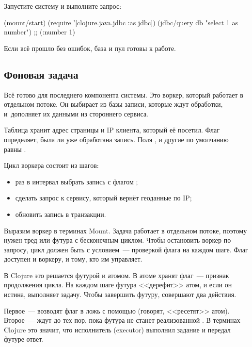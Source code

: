 Запустите систему и выполните запрос:

\begin{clojure}
(mount/start)
(require '[clojure.java.jdbc :as jdbc])
(jdbc/query db "select 1 as number")
;; ({:number 1})
\end{clojure}

Если всё прошло без ошибок, база и пул готовы к работе.

\subsection{Фоновая задача}

\label{worker}

Всё готово для последнего компонента системы. Это воркер, который работает в
отдельном потоке. Он выбирает из базы записи, которые ждут обработки,
и~дополняет их данными из стороннего сервиса.

Таблица  хранит адрес страницы и IP клиента, который её
посетил. Флаг  определяет, была ли уже обработана
запись. Поля ,  и другие по умолчанию равны
.


Цикл воркера состоит из шагов:

\begin{itemize}

\item
  раз в интервал выбрать запись с флагом ;

\item
  сделать запрос к сервису, который вернёт геоданные по IP;

\item
  обновить запись в транзакции.

\end{itemize}

Выразим воркер в терминах Mount. Задача работает в отдельном потоке, поэтому
нужен тред или футура с бесконечным циклом. Чтобы остановить воркер по запросу,
цикл должен быть с условием~--- проверкой флага на каждом шаге. Флаг доступен и
воркеру, и тому, кто им управляет.


В Clojure это решается футурой и атомом. В атоме хранят флаг~--- признак
продолжения цикла. На каждом шаге футура <<дерефит>> атом, и если он истина,
выполняет задачу. Чтобы завершить футуру, совершают два действия.

Первое~--- возводят флаг в ложь с помощью  (говорят, <<ресетят>>
атом). Второе~--- ждут до тех пор, пока футура не станет реализованной
. В терминах Clojure это значит, что исполнитель (executor)
выполнил задание и передал футуре ответ.


